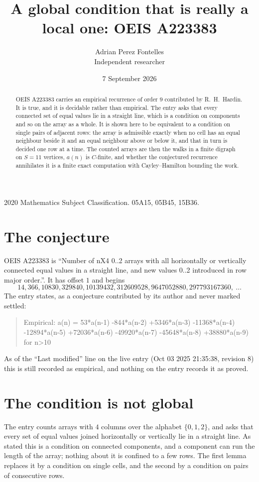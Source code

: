\documentclass[11pt,a4paper]{article}
\title{A global condition that is really a local one: OEIS A223383}
\author{Adrian Perez Fontelles\\ \small Independent researcher}
\date{7 September 2026}
\theoremstyle{plain}
\theoremstyle{definition}
\begin{document}
\maketitle

\begin{abstract}
OEIS A223383 carries an empirical recurrence of order $9$ contributed by R.~H.~Hardin. It is
true, and it is decidable rather than empirical. The entry asks that every connected set of
equal values lie in a straight line, which is a condition on components and so on the array as
a whole. It is shown here to be equivalent to a condition on single pairs of adjacent rows:
the array is admissible exactly when no cell has an equal neighbour beside it and an equal
neighbour above or below it, and that in turn is decided one row at a time. The counted arrays
are then the walks in a finite digraph on $S=11$ vertices, $a(n)$ is $C$-finite, and whether
the conjectured recurrence annihilates it is a finite exact computation with Cayley--Hamilton
bounding the work.
\end{abstract}

\noindent\small 2020 Mathematics Subject Classification. 05A15, 05B45, 15B36.\normalsize

\section{The conjecture}

OEIS A223383 is ``Number of nX4 0..2 arrays with all horizontally or vertically connected equal values in a straight line, and new values 0..2 introduced in row major order.''. It has offset $1$ and begins
\[
14, 366, 10830, 329840, 10139432, 312609528, 9647052880, 297793167360,\ \dots
\]
The entry states, as a conjecture contributed by its author and never marked settled:
\begin{quote}
Empirical: a(n) = 53*a(n-1) -844*a(n-2) +5346*a(n-3) -11368*a(n-4) -12894*a(n-5) +72036*a(n-6) -49920*a(n-7) -45648*a(n-8) +38880*a(n-9) for n>10
\end{quote}
As of the ``Last modified'' line on the live entry (Oct 03 2025 21:35:38, revision 8) this is still
recorded as empirical, and nothing on the entry records it as proved.

\section{The condition is not global}

The entry counts arrays with $4$ columns over the alphabet $\{0,1,2\}$, and asks that every set of equal values joined horizontally or vertically lie in a straight line. As stated this is a condition on connected components, and a component can run the length of the array; nothing about it is confined to a few rows. The first lemma replaces it by a condition on single cells, and the second by a condition on pairs of consecutive rows.
\end{document}
